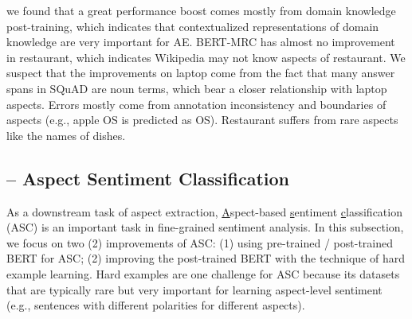 \begin{table}[H]
    \centering
    \caption{BERT for AE in F1.}
\label{chap6:tbl:result_ae}
\vspace{-5mm}
\end{table}

we found that a great performance boost comes mostly from domain knowledge post-training, which indicates that contextualized representations of domain knowledge are very important for AE. BERT-MRC has almost no improvement in restaurant, which indicates Wikipedia may not know aspects of restaurant.
We suspect that the improvements on laptop come from the fact that many answer spans in SQuAD are noun terms, which bear a closer relationship with laptop aspects.
Errors mostly come from annotation inconsistency and boundaries of aspects (e.g., apple OS is predicted as OS). Restaurant suffers from rare aspects like the names of dishes.


\subsection{-- Aspect Sentiment Classification}

As a downstream task of aspect extraction, \underline{A}spect-based \underline{s}entiment \underline{c}lassification (ASC) is an important task in fine-grained sentiment analysis.
In this subsection, we focus on two (2) improvements of ASC: (1) using pre-trained / post-trained BERT for ASC; (2) improving the post-trained BERT with the technique of hard example learning.
Hard examples are one challenge for ASC because its datasets that are typically rare but very important for learning aspect-level sentiment (e.g., sentences with different polarities for different aspects).

